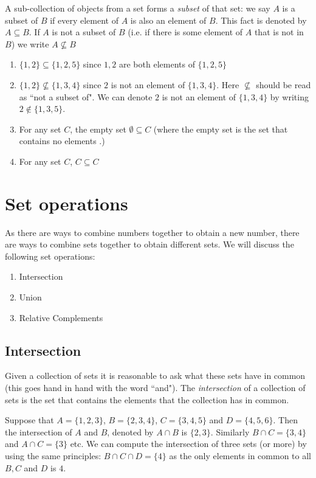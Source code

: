 \begin{appendices}
		A sub-collection of objects from a set forms a \textit{subset} of that set: we say $A$ is a subset of $B$ if every element of $A$ is also an element of $B$. This fact is denoted by $A\subseteq{B}$. If $A$ is not a subset of $B$ (i.e. if there is some element of $A$ that is not in $B$) we write $A\nsubseteq B$ 
		\begin{enumerate}
			\item $\{1,2\}\subseteq\{1,2,5\}$ since $1,2$ are both elements of $\{1,2,5\}$
			\item $\{1,2\}\nsubseteq\{1,3,4\}$ since $2$ is not an element of $\{1,3,4\}$. Here $\nsubseteq$ should be read as ``not a subset of". We can denote $2$ is not an element of $\{1,3,4\}$ by writing $2\notin\{1,3,5\}$.
			\item For any set $C$, the empty set $\emptyset\subseteq C$ (where the empty set is the set that contains no elements .)
			\item For any set $C$, $C\subseteq C$
		\end{enumerate}
		
		\section{Set operations}
		As there are ways to combine numbers together to obtain a new number, there are ways to combine sets together to obtain different sets. We will discuss the following set operations: \begin{enumerate}
			\item Intersection 
			\item Union
			\item  Relative Complements
		\end{enumerate} 
		
		\subsection{Intersection}
		
		Given a collection of sets it is reasonable to ask what these sets have in common (this goes hand in hand with the word ``and"). The \textit{intersection} of a collection of sets is the set that contains the elements that the collection has in common.
		\begin{ex}
			Suppose that $A=\{1, 2, 3\}$, $B=\{2, 3, 4\}$, $C=\{3, 4, 5\}$ and $D=\{4, 5, 6\}$. Then the intersection of $A$ and $B$, denoted by $A\cap B$ is $\{2, 3\}$. Similarly $B\cap C=\{3, 4\}$ and $A\cap C=\{3\}$ etc. We can compute the intersection of three sets (or more) by using the same principles: $B\cap C\cap D=\{4\}$ as the only elements in common to all $B, C$ and $D$  is $4$.
		\end{ex} 
		

\end{appendices}
